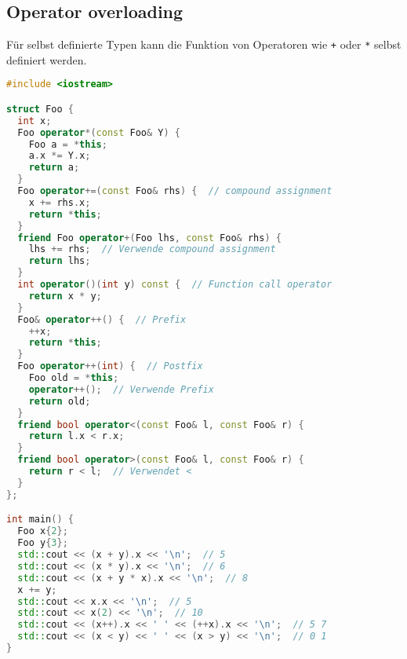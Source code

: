 \subsection{Operator overloading}

Für selbst definierte Typen kann die Funktion von Operatoren wie \lstinline|+|
oder \lstinline|*| selbst definiert werden.

\begin{lstlisting}[language=C++]
#include <iostream>

struct Foo {
  int x;
  Foo operator*(const Foo& Y) {
    Foo a = *this;
    a.x *= Y.x;
    return a;
  }
  Foo operator+=(const Foo& rhs) {  // compound assignment
    x += rhs.x;
    return *this;
  }
  friend Foo operator+(Foo lhs, const Foo& rhs) {
    lhs += rhs;  // Verwende compound assignment
    return lhs;
  }
  int operator()(int y) const {  // Function call operator
    return x * y;
  }
  Foo& operator++() {  // Prefix
    ++x;
    return *this;
  }
  Foo operator++(int) {  // Postfix
    Foo old = *this;
    operator++();  // Verwende Prefix
    return old;
  }
  friend bool operator<(const Foo& l, const Foo& r) {
    return l.x < r.x;
  }
  friend bool operator>(const Foo& l, const Foo& r) {
    return r < l;  // Verwendet <
  }
};

int main() {
  Foo x{2};
  Foo y{3};
  std::cout << (x + y).x << '\n';  // 5
  std::cout << (x * y).x << '\n';  // 6
  std::cout << (x + y * x).x << '\n';  // 8
  x += y;
  std::cout << x.x << '\n';  // 5
  std::cout << x(2) << '\n';  // 10
  std::cout << (x++).x << ' ' << (++x).x << '\n';  // 5 7
  std::cout << (x < y) << ' ' << (x > y) << '\n';  // 0 1
}
\end{lstlisting}